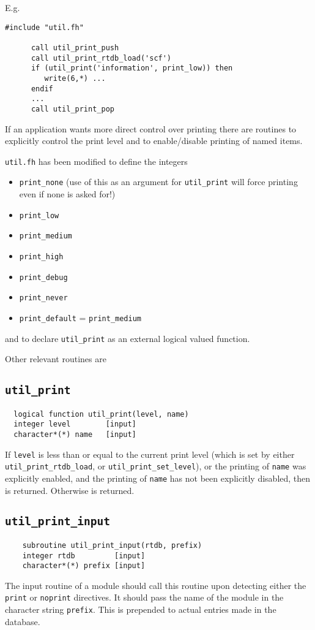 \fussy

 E.g.
\begin{verbatim}
#include "util.fh"

      call util_print_push
      call util_print_rtdb_load('scf')
      if (util_print('information', print_low)) then
         write(6,*) ...
      endif
      ...
      call util_print_pop
\end{verbatim}

 If an application wants more direct control over printing there are
routines to explicitly control the print level and to enable/disable
printing of named items.

{\tt util.fh} has been modified to define the integers
\begin{itemize}
\item \verb+print_none+ (use of this as an argument for
  \verb+util_print+ will force printing even if none is asked for!)
\item \verb+print_low+
\item \verb+print_medium+
\item \verb+print_high+
\item \verb+print_debug+
\item \verb+print_never+
\item \verb+print_default+ = \verb+print_medium+
\end{itemize}
and to declare \verb+util_print+ as an external logical valued function.

Other relevant routines are

\subsection{{\tt util\_print}}
\sloppy
\begin{verbatim}
  logical function util_print(level, name)
  integer level        [input]
  character*(*) name   [input]
\end{verbatim}
If \verb+level+ is less than or equal to the current print level
(which is set by either \verb+util_print_rtdb_load+, or
\verb+util_print_set_level+), or the printing of \verb+name+ was
explicitly enabled, and the printing of \verb+name+ has not been
explicitly disabled, then \TRUE is returned.  Otherwise
\FALSE is returned.

\fussy

\subsection{{\tt util\_print\_input}}
\begin{verbatim}
    subroutine util_print_input(rtdb, prefix)
    integer rtdb         [input]
    character*(*) prefix [input]
\end{verbatim}
The input routine of a module should call this routine upon detecting
either the {\tt print} or {\tt noprint} directives.  It should pass
the name of the module in the character string {\tt prefix}.  This is
prepended to actual entries made in the database.

